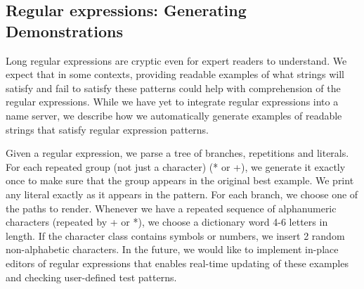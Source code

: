 \begin{figure}
\end{figure}

\subsection{Regular expressions: Generating Demonstrations}

Long regular expressions are cryptic even for expert readers to understand.
We expect that in some contexts, providing readable examples of what strings will satisfy and fail to satisfy these patterns could help with comprehension of the regular expressions.
While we have yet to integrate regular expressions into a \gls{name} server, we describe how we automatically generate examples of readable strings that satisfy regular expression patterns.

Given a regular expression, we parse a tree of branches, repetitions and literals.
For each repeated group (not just a character) (* or +), we generate it exactly once to make sure that the group appears in the original best example.
We print any literal exactly as it appears in the pattern.
For each branch, we choose one of the paths to render.
Whenever we have a repeated sequence of alphanumeric characters (repeated by + or *), we choose a dictionary word 4-6 letters in length.
If the character class contains symbols or numbers, we insert 2 random non-alphabetic characters.
In the future, we would like to implement in-place editors of regular expressions that enables real-time updating of these examples and checking user-defined test patterns.

